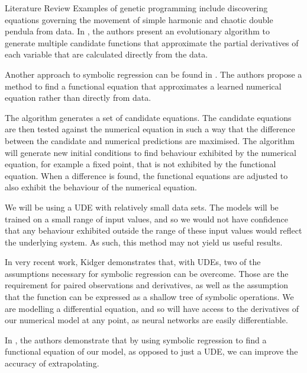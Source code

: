 \documentclass[12pt]{amsbook}
\begin{document}
\begin{chapter}{Literature Review}
        Examples of genetic programming include discovering equations governing the movement of simple harmonic and chaotic double pendula from data. In \cite{schmidt2009distilling}, the authors present an evolutionary algorithm to generate multiple candidate functions that approximate the partial derivatives of each variable that are calculated directly from the data. 
        
        Another approach to symbolic regression can be found in \cite{bongard2007automated}. The authors propose a method to find a functional equation that approximates a learned numerical equation rather than directly from data. 
        
        The algorithm generates a set of candidate equations. The candidate equations are then tested against the numerical equation in such a way that the difference between the candidate and numerical predictions are maximised. The algorithm will generate new initial conditions to find behaviour exhibited by the numerical equation, for example a fixed point, that is not exhibited by the functional equation. When a difference is found, the functional equations are adjusted to also exhibit the behaviour of the numerical equation. 
        
        We will be using a UDE with relatively small data sets. The models will be trained on a small range of input values, and so we would not have confidence that any behaviour exhibited outside the range of these input values would reflect the underlying system. As such, this method may not yield us useful results.
        
        In very recent work, Kidger\cite{kidger2022neural} demonstrates that, with UDEs, two of the assumptions necessary for symbolic regression can be overcome. Those are the requirement for paired observations and derivatives, as well as the assumption that the function can be expressed as a shallow tree of symbolic operations. We are modelling a differential equation, and so will have access to the derivatives of our numerical model at any point, as neural networks are easily differentiable. 

        In \cite{SciML_C_Rak}, the authors demonstrate that by using symbolic regression to find a functional equation of our model, as opposed to just a UDE, we can improve the accuracy of extrapolating.
\end{chapter}
\end{document}

